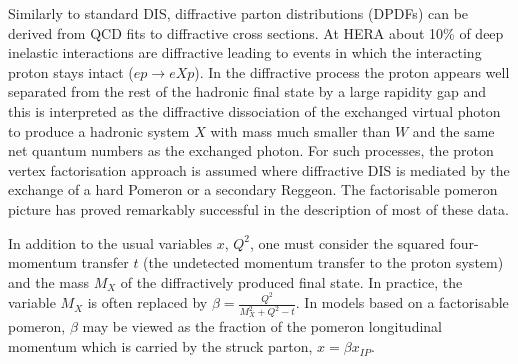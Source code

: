 \newcommand{\asotp}{\ensuremath{\frac{\alpha_{\rm s}}{2\pi}}}
\newcommand{\Sgl}[1]{\ensuremath{\tilde f_{#1+}}}
\newcommand{\Pom}{{I\!P}}
\newcommand{\Reg}{{I\!R}}
\newcommand{\xpom}{$x_{I\!P}$}


Similarly to standard DIS, diffractive parton distributions (DPDFs) 
can be derived from QCD fits to diffractive cross sections.
At HERA about 10\% of deep inelastic interactions are diffractive leading to
events in which the interacting proton stays intact ($ep\to eXp$). 
In the diffractive process the proton appears well separated from the 
rest of the hadronic final state by a large rapidity gap  
and this is interpreted as the diffractive dissociation 
of the exchanged virtual photon to produce a hadronic system $X$ with mass much 
smaller than $W$ and the same net quantum numbers as the exchanged photon.
For such processes, the proton vertex factorisation approach
is assumed where diffractive DIS is mediated by the exchange of a hard Pomeron 
or a
secondary Reggeon. 
The factorisable pomeron picture has proved remarkably successful in the description of most of these data.
%

In addition to the usual variables $x$, $Q^2$, one must consider the squared four-momentum transfer $t$
(the undetected momentum transfer to the proton system) and
the mass $M_X$ of the diffractively produced final state. 
In practice, the variable $M_X$ 
is often replaced by $\beta=\frac{Q^2}{M_X^2+Q^2-t}$.
%
In models based on a factorisable pomeron, $\beta$ may be viewed as the fraction of the
pomeron longitudinal momentum which is carried by the struck parton, $x=\beta x_{\Pom}$.

